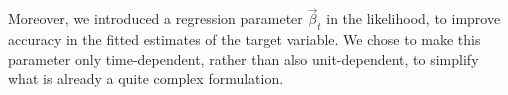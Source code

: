 \documentclass[12pt,	%
	a4paper,		%
	twoside,		%
	openright,		%
	titlepage,%
	]{book}
\theoremstyle{definition}
\begin{document}
Moreover, we introduced a regression parameter $\vec{\beta}_t$ in the likelihood, to improve accuracy in the fitted estimates of the target variable. We chose to make this parameter only time-dependent, rather than also unit-dependent, to simplify what is already a quite complex formulation.
\end{document}

